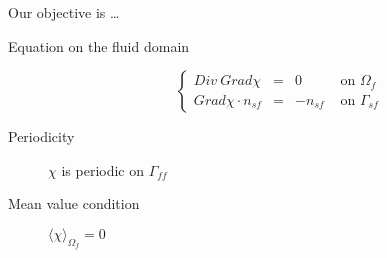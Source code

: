 
Our objective is \dots









\begin{description}
\item[Equation on the fluid domain] 
\begin{equation}\label{chistr}
\left\{%
\begin{array}{lccr}
Div \ Grad \chi &=& 0&\text{ on }\Omega_f \\
Grad \chi \cdot n_{sf}&=&-n_{sf}&\text{ on }\Gamma_{sf}
\end{array}
\right.
\end{equation}
\item[Periodicity] $\chi$ is periodic on $\Gamma_{ff}$
\item[Mean value condition] $\langle\chi\rangle_{\Omega_f}=0$
\end{description}